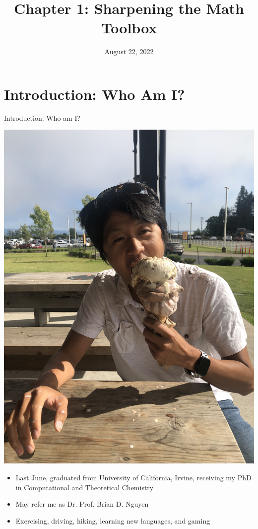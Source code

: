 \documentclass[11pt]{beamer}
\title{Chapter 1: Sharpening the Math Toolbox}
\institute{Chemistry Department, Cypress College}
\date{August 22, 2022}
\begin{document}
\begin{frame}
  \titlepage
\end{frame}

\section{Introduction: Who Am I?}

\begin{frame}{Introduction: Who am I?}
  \begin{center}
    \includegraphics[angle=-90,origin=c,scale=0.03]{triple_ice}
  \end{center}
  \begin{itemize}
  \item Last June, graduated from University of California, Irvine,
    receiving my PhD in Computational and Theoretical Chemistry
  \item May refer me as Dr. Prof. Brian D. Nguyen
  \item Exercising, driving, hiking, learning new languages, and gaming
  \end{itemize}
\end{frame}
\end{document}
